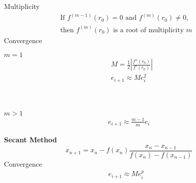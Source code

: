 \documentclass[10pt]{article}
\begin{document}
\begin{multicols}{2}
\begin{minipage}{\columnwidth}
\begin{flushright}
            Multiplicity
            \begin{equation*}
                \begin{aligned}
                    \text{If } f^{(m-1)}(r_0) = 0 \text{ and } f^{(m)}(r_0) \neq 0 \text{,} & \\
                    \text{then } f^{(m)}(r_0) \text{ is a root of multiplicity } m          &
                \end{aligned}
            \end{equation*}
            Convergence
            \vspace*{-1em}
            \setlength{\columnsep}{-1in}
            \begin{multicols}{2}
                \begin{minipage}{1in}
                    \(m = 1\)
                    \begin{equation*}
                        \begin{aligned}
                             & M = \frac{1}{2} \left| \frac{f''(r_0)}{f'(r_0)} \right| \\
                             & e_{i+1} \approx Me_i^2                                  \\
                        \end{aligned}
                    \end{equation*}
                \end{minipage} \\
                \begin{minipage}{1in}
                    \(m > 1\)
                    \begin{equation*}
                        \begin{aligned}
                            e_{i+1} \approx \frac{m-1}{m} e_i
                        \end{aligned}
                    \end{equation*}
                \end{minipage}
            \end{multicols}
            \textbf{Secant Method}
            \begin{equation*}
                x_{n+1} = x_n - f(x_n)\frac{x_n - x_{n-1}}{f(x_n) - f(x_{n-1})}
            \end{equation*}
            Convergence
            \begin{equation*}
                \begin{aligned}
                    e_{i+1} \approx Me_i^p                            & \\

\end{aligned}
\end{equation*}
\end{flushright}
\end{minipage}
\end{multicols}
\end{document}
